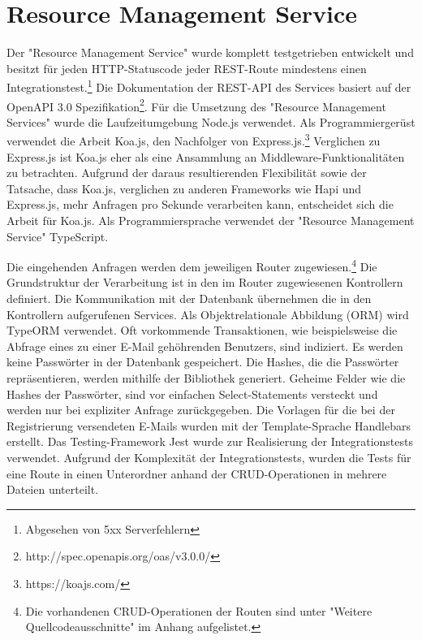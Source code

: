 \section{Resource Management Service}
\label{sec:resourcemanagementservice}
Der "Resource Management Service" wurde komplett testgetrieben entwickelt und besitzt
für jeden HTTP-Statuscode jeder REST-Route mindestens einen Integrationstest.\footnote{Abgesehen von 5xx Serverfehlern}
Die Dokumentation der REST-API des Services basiert auf der OpenAPI 3.0
Spezifikation\footnote{http://spec.openapis.org/oas/v3.0.0/}. Für die Umsetzung des "Resource Management Services"
wurde die Laufzeitumgebung Node.js verwendet. Als Programmiergerüst verwendet die Arbeit Koa.js, den Nachfolger
von Express.js.\footnote{https://koajs.com/} Verglichen zu Express.js ist Koa.js eher als eine Ansammlung
an Middleware-Funktionalitäten zu betrachten\cite[2. Absatz]{ExpressVsKoa}. Aufgrund der daraus resultierenden
Flexibilität sowie der Tatsache, dass Koa.js, verglichen zu anderen Frameworks wie Hapi und Express.js,
mehr Anfragen pro Sekunde verarbeiten kann,\cite{ExpressVsKoaVsHapiPerformance}
entscheidet sich die Arbeit für Koa.js. Als Programmiersprache verwendet der "Resource Management Service"
TypeScript.

Die eingehenden Anfragen werden dem jeweiligen Router zugewiesen.\footnote{Die vorhandenen CRUD-Operationen der Routen sind
unter "Weitere Quellcodeausschnitte" im Anhang aufgelistet.} Die Grundstruktur der Verarbeitung ist in den im Router
zugewiesenen Kontrollern definiert. Die Kommunikation mit der Datenbank übernehmen die in den Kontrollern aufgerufenen
Services. Als Objektrelationale Abbildung (ORM) wird TypeORM verwendet. Oft vorkommende Transaktionen, wie beispielsweise
die Abfrage eines zu einer E-Mail gehöhrenden Benutzers, sind indiziert. Es werden keine Passwörter in der Datenbank gespeichert.
Die Hashes, die die Passwörter repräsentieren, werden mithilfe der Bibliothek  generiert.
Geheime Felder wie die Hashes der Passwörter, sind vor einfachen Select-Statements versteckt und werden nur bei
expliziter Anfrage zurückgegeben. Die Vorlagen für die bei der Registrierung versendeten E-Mails wurden mit
der Template-Sprache Handlebars erstellt. Das Testing-Framework Jest wurde zur Realisierung der Integrationstests
verwendet. Aufgrund der Komplexität der Integrationstests, wurden die Tests für eine Route in einen Unterordner
anhand der CRUD-Operationen in mehrere Dateien unterteilt.

